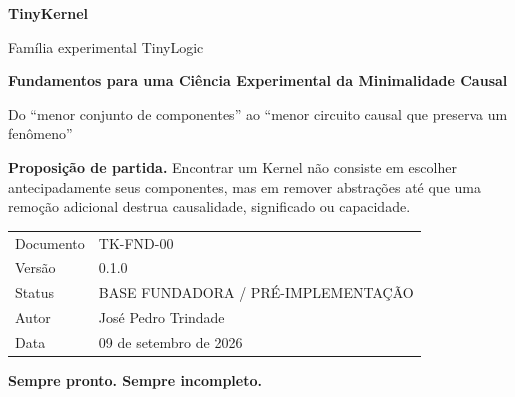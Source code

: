 \documentclass[11pt,a4paper]{article}
\newcommand{\TKProject}{TinyKernel}
\newcommand{\TKDocID}{TK-FND-00}
\newcommand{\TKVersion}{0.1.0}
\newcommand{\TKDate}{09 de setembro de 2026}
\newcommand{\TKStatus}{BASE FUNDADORA / PRÉ-IMPLEMENTAÇÃO}
\newcommand{\TKMotto}{Sempre pronto. Sempre incompleto.}
\begin{document}
\begin{titlepage}
\pagecolor{TKDark}
\color{white}

\vspace*{1.5cm}

{\sffamily\small
\textbf{\TKProject}\par
Família experimental TinyLogic\par}

\vspace{2.0cm}

{\sffamily\bfseries\fontsize{28}{33}\selectfont
Fundamentos para uma Ciência Experimental da Minimalidade Causal\par}

\vspace{0.6cm}

{\sffamily\fontsize{14}{19}\selectfont\color{white!78}
Do “menor conjunto de componentes” ao “menor circuito causal que preserva um fenômeno”\par}

\vspace{1.2cm}

\begin{tcolorbox}[
  enhanced,
  colback=white!6,
  colframe=white!35,
  boxrule=0.6pt,
  arc=2mm,
  left=4mm,right=4mm,top=3mm,bottom=3mm
]
\color{white}
\textbf{Proposição de partida.}
Encontrar um Kernel não consiste em escolher antecipadamente seus componentes,
mas em remover abstrações até que uma remoção adicional destrua causalidade,
significado ou capacidade.
\end{tcolorbox}

\vfill

{\sffamily
\begin{tabular}{@{}ll@{}}
Documento & \TKDocID \\
Versão & \TKVersion \\
Status & \TKStatus \\
Autor & José Pedro Trindade \\
Data & \TKDate \\
\end{tabular}
}

\vspace{1.1cm}

{\sffamily\bfseries\color{white!92}\TKMotto\par}

\end{titlepage}
\nopagecolor
\color{TKInk}
\end{document}
